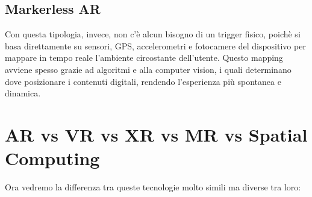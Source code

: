 \subsection{Markerless AR}
Con questa tipologia, invece, non c'è alcun bisogno di un trigger fisico, poichè si basa direttamente su sensori, GPS, accelerometri e fotocamere del dispositivo per mappare in tempo reale l'ambiente circostante dell'utente. Questo mapping avviene spesso grazie ad algoritmi e alla computer vision, i quali determinano dove posizionare i contenuti digitali, rendendo l'esperienza più spontanea e dinamica.
 
\section{AR vs VR vs XR vs MR vs Spatial Computing}
Ora vedremo la differenza tra queste tecnologie molto simili ma diverse tra loro\cite{ar-vs-other}\cite{The-virtuality-continuum}:

